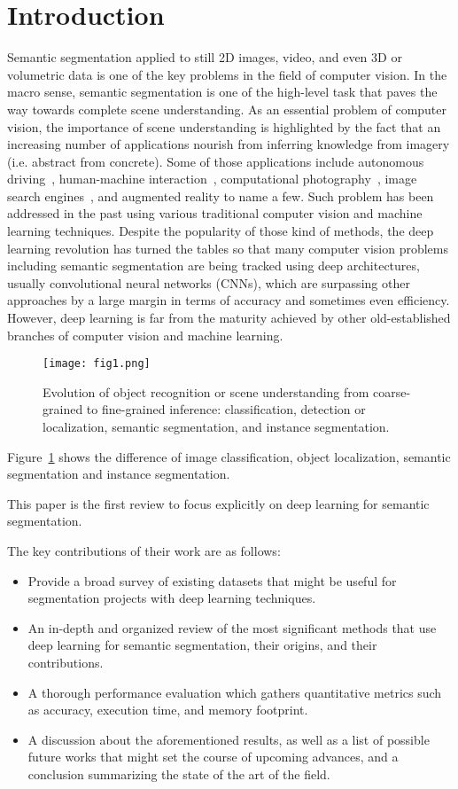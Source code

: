 \documentclass[10pt,twocolumn,letterpaper]{article}
\begin{document}
	\section*{Introduction}
	Semantic segmentation applied to still 2D images, video, and even 3D or volumetric data is one of the key problems in the field of computer vision. In the macro sense, semantic segmentation is one of the high-level task that paves the way towards complete scene understanding. As an essential problem of computer vision, the importance of scene understanding is highlighted by the fact that an increasing number of applications nourish from inferring knowledge from imagery (i.e. abstract from concrete). Some of those applications include autonomous driving~\cite{Ess2009,Geiger2012Are,Cordts2016}, human-machine interaction~\cite{Oberweger2015}, computational photography~\cite{Yoon2015}, image search engines~\cite{Wan2014}, and augmented reality to name a few. Such problem has been addressed in the past using various traditional computer vision and machine learning techniques. Despite the popularity of those kind of methods, the deep learning revolution has turned the tables so that many computer vision problems including semantic segmentation are being tracked using deep architectures, usually convolutional neural networks (CNNs), which are surpassing other approaches by a large margin in terms of accuracy and sometimes even efficiency. However, deep learning is far from the maturity achieved by other old-established branches of computer vision and machine learning. 
	\begin{figure}[h]
		\centering
		\texttt{[image: fig1.png]}
		\caption{Evolution of object recognition or scene understanding from coarse-grained to fine-grained inference: classification, detection or localization, semantic segmentation, and instance segmentation.} \label{fig1}
	\end{figure}
	\par
	Figure~\ref{fig1} shows the difference of image classification, object localization, semantic segmentation and instance segmentation.
	\par
	This paper is the first review to focus explicitly on deep learning for semantic segmentation.
	\par
	The key contributions of their work are as follows:
	\begin{itemize}
		\item Provide a broad survey of existing datasets that might be useful for segmentation projects with deep learning techniques.
		\item An in-depth and organized review of the most significant methods that use deep learning for semantic segmentation, their origins, and their contributions.
		\item A thorough performance evaluation which gathers quantitative metrics such as accuracy, execution time, and memory footprint.
		\item A discussion about the aforementioned results, as well as a list of possible future works that might set the course of upcoming advances, and a conclusion summarizing the state of the art of the field.
	\end{itemize}
	{\small
		
		
	}
\end{document}

